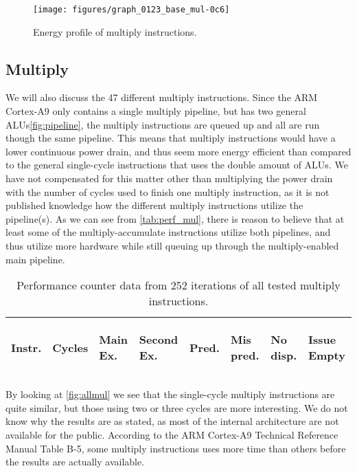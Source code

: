 \begin{figure*}
    \centering
    \texttt{[image: figures/graph\_0123\_base\_mul-0c6]}
    \caption{Energy profile of multiply instructions.}
    \label{fig:allmul}
\end{figure*}

\subsection{Multiply}
We will also discuss the 47 different multiply instructions. Since the ARM
Cortex-A9 only contains a single multiply pipeline, but has two general
ALUs\autoref{fig:pipeline}, the multiply instructions are queued up and all are
run though the same pipeline. This means that multiply instructions would have a
lower continuous power drain, and thus seem more energy efficient than compared
to the general single-cycle instructions that uses the double amount of ALUs. We
have not compensated for this matter other than multiplying the power drain with
the number of cycles used to finish one multiply instruction, as it is not
published knowledge how the different multiply instructions utilize the
pipeline(s). As we can see from \autoref{tab:perf_mul}, there is reason to
believe that at least some of the multiply-accumulate instructions utilize both
pipelines\cite{ramangcc}, and thus utilize more hardware while still queuing up
through the multiply-enabled main pipeline.

\begin{table}
    \centering
    \begin{tabular}{|p{0.7cm}|R{0.8cm}R{0.6cm}R{0.85cm}R{0.6cm}R{0.45cm}R{0.75cm}R{0.72cm}|}
        \hline
        \centering
        Instr. &
        \centering
        Cycles &
        \centering
        Main Ex. &
        \centering
        Second Ex. &
        \centering
        Pred.&
        \centering
        Mis pred.&
        \centering
        No disp. &
        \begin{centering}
        Issue Empty
        \end{centering}
        \\
        \hline
        
        \hline
    \end{tabular}
    \caption{Performance counter data from 252 iterations of all tested multiply
    instructions.}
    \label{tab:perf_mul}
\end{table}

By looking at \autoref{fig:allmul} we see that the single-cycle multiply
instructions are quite similar, but those using two or three cycles are more
interesting. We do not know why the results are as stated, as most of the
internal architecture are not available for the public. According to the ARM
Cortex-A9 Technical Reference Manual Table B-5, some multiply instructions uses
more time than others before the results are actually available\cite{armtech}.


